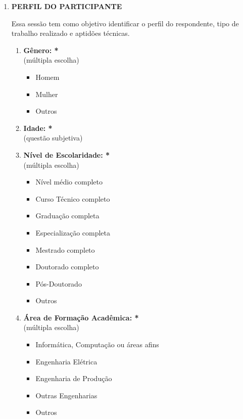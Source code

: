 \begin{enumerate}[label=\bf A\arabic*,leftmargin=1.8cm]
    

    \item \textbf{PERFIL DO PARTICIPANTE}
    
    Essa sessão tem como objetivo identificar o perfil do respondente, tipo de trabalho realizado e aptidões técnicas.
    
     \begin{enumerate}[label= \arabic*]
     
        \item \textbf{Gênero: *}\\
        (múltipla escolha)
        \begin{itemize}
            \item Homem
            \item Mulher
            \item Outros
        \end{itemize}
        
        \item \textbf{Idade: *}\\
        (questão subjetiva)
        
        \item \textbf{Nível de Escolaridade: *}\\
        (múltipla escolha)
        \begin{itemize}
            \item Nível médio completo
            \item Curso Técnico completo
            \item Graduação completa
            \item Especialização completa
            \item Mestrado completo
            \item Doutorado completo
            \item Pós-Doutorado
            \item Outros
        \end{itemize}
        
        \item \textbf{Área de Formação Acadêmica: *}\\
        (múltipla escolha)
        \begin{itemize}
            \item Informática, Computação ou áreas afins
            \item Engenharia Elétrica
            \item Engenharia de Produção
            \item Outras Engenharias
            \item Outros
        \end{itemize}
        

\end{enumerate}
\end{enumerate}
